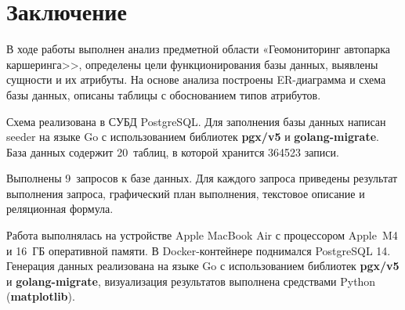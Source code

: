 \section*{Заключение}

В ходе работы выполнен анализ предметной области «Геомониторинг автопарка каршеринга>>, определены цели функционирования базы данных, выявлены сущности и их атрибуты. На основе анализа построены ER-диаграмма и схема базы данных, описаны таблицы с обоснованием типов атрибутов.

Схема реализована в СУБД PostgreSQL. Для заполнения базы данных написан seeder на языке Go с использованием библиотек \textbf{pgx/v5} и \textbf{golang-migrate}. База данных содержит 20~таблиц, в которой хранится 364523 записи. 

Выполнены 9~запросов к базе данных. Для каждого запроса приведены результат выполнения запроса, графический план выполнения, текстовое описание и реляционная формула.

Работа выполнялась на устройстве Apple MacBook Air с процессором Apple~M4 и 16~ГБ оперативной памяти. 
В Docker-контейнере поднимался PostgreSQL 14. Генерация данных реализована на языке Go с использованием библиотек \textbf{pgx/v5} и \textbf{golang-migrate}, визуализация результатов выполнена средствами Python (\textbf{matplotlib}).

\newpage
